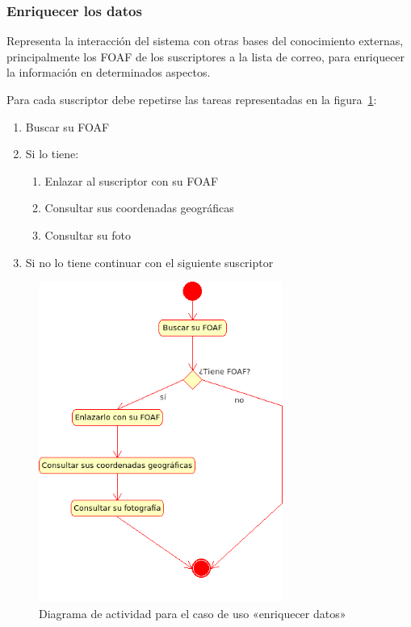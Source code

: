 \subsubsection{Enriquecer los datos}

Representa la interacción del sistema con otras bases del conocimiento externas, 
principalmente los FOAF de los suscriptores a la lista de correo, para enriquecer 
la información en determinados aspectos.

Para cada suscriptor debe repetirse las tareas representadas en la 
figura~\ref{fig:uml:enriquecer}:

\begin{enumerate}
  \item Buscar su FOAF
  \item Si lo tiene:
	\begin{enumerate}
	  \item	Enlazar al suscriptor con su FOAF
	  \item Consultar sus coordenadas geográficas
	  \item Consultar su foto
	\end{enumerate}
  \item Si no lo tiene continuar con el siguiente suscriptor
\end{enumerate}

\begin{figure}[H]
 	\centering
	\includegraphics[width=8cm]{images/uml/casos-uso/enriquecer.png}
	\caption{Diagrama de actividad para el caso de uso «enriquecer datos»}
	\label{fig:uml:enriquecer}
\end{figure}

